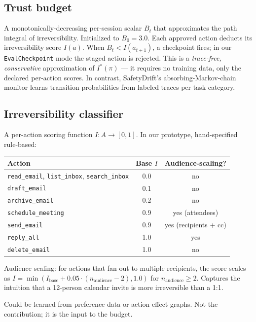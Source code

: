 \documentclass[11pt]{article}
\begin{document}
\subsection{Trust budget}

A monotonically-decreasing per-session scalar $B_t$ that approximates the path integral of irreversibility. Initialized to $B_0 = 3.0$. Each approved action deducts its irreversibility score $I(a)$. When $B_t < I(a_{t+1})$, a checkpoint fires; in our \texttt{EvalCheckpoint} mode the staged action is rejected. This is a \emph{trace-free, conservative} approximation of $I^*(\pi)$ --- it requires no training data, only the declared per-action scores. In contrast, SafetyDrift's absorbing-Markov-chain monitor learns transition probabilities from labeled traces per task category.

\subsection{Irreversibility classifier}

A per-action scoring function $I: A \to [0, 1]$. In our prototype, hand-specified rule-based:

\begin{table}[h]
\centering
\begin{tabular}{lcc}
\toprule
Action & Base $I$ & Audience-scaling? \\
\midrule
\texttt{read\_email}, \texttt{list\_inbox}, \texttt{search\_inbox} & 0.0 & no \\
\texttt{draft\_email} & 0.1 & no \\
\texttt{archive\_email} & 0.2 & no \\
\texttt{schedule\_meeting} & 0.9 & yes (attendees) \\
\texttt{send\_email} & 0.9 & yes (recipients + cc) \\
\texttt{reply\_all} & 1.0 & yes \\
\texttt{delete\_email} & 1.0 & no \\
\bottomrule
\end{tabular}
\end{table}

Audience scaling: for actions that fan out to multiple recipients, the score scales as $I = \min(I_\text{base} + 0.05 \cdot (n_\text{audience} - 2), 1.0)$ for $n_\text{audience} \geq 2$. Captures the intuition that a 12-person calendar invite is more irreversible than a 1:1.

Could be learned from preference data or action-effect graphs. Not the contribution; it is the input to the budget.
\end{document}
